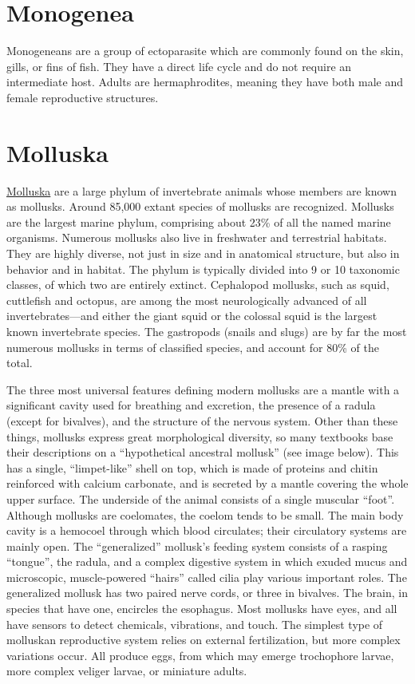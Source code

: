 \section{Monogenea}\label{monogenea}

Monogeneans are a group of ectoparasite which are commonly found on the
skin, gills, or fins of fish. They have a direct life cycle and do not
require an intermediate host. Adults are hermaphrodites, meaning they
have both male and female reproductive structures.

\section{Molluska}\label{molluska}

\href{https://en.wikipedia.org/wiki/Mollusca}{Molluska} are a large
phylum of invertebrate animals whose members are known as mollusks.
Around 85,000 extant species of mollusks are recognized. Mollusks are
the largest marine phylum, comprising about 23\% of all the named marine
organisms. Numerous mollusks also live in freshwater and terrestrial
habitats. They are highly diverse, not just in size and in anatomical
structure, but also in behavior and in habitat. The phylum is typically
divided into 9 or 10 taxonomic classes, of which two are entirely
extinct. Cephalopod mollusks, such as squid, cuttlefish and octopus, are
among the most neurologically advanced of all invertebrates---and either
the giant squid or the colossal squid is the largest known invertebrate
species. The gastropods (snails and slugs) are by far the most numerous
mollusks in terms of classified species, and account for 80\% of the
total.

The three most universal features defining modern mollusks are a mantle
with a significant cavity used for breathing and excretion, the presence
of a radula (except for bivalves), and the structure of the nervous
system. Other than these things, mollusks express great morphological
diversity, so many textbooks base their descriptions on a ``hypothetical
ancestral mollusk'' (see image below). This has a single,
``limpet-like'' shell on top, which is made of proteins and chitin
reinforced with calcium carbonate, and is secreted by a mantle covering
the whole upper surface. The underside of the animal consists of a
single muscular ``foot''. Although mollusks are coelomates, the coelom
tends to be small. The main body cavity is a hemocoel through which
blood circulates; their circulatory systems are mainly open. The
``generalized'' mollusk's feeding system consists of a rasping
``tongue'', the radula, and a complex digestive system in which exuded
mucus and microscopic, muscle-powered ``hairs'' called cilia play
various important roles. The generalized mollusk has two paired nerve
cords, or three in bivalves. The brain, in species that have one,
encircles the esophagus. Most mollusks have eyes, and all have sensors
to detect chemicals, vibrations, and touch. The simplest type of
molluskan reproductive system relies on external fertilization, but more
complex variations occur. All produce eggs, from which may emerge
trochophore larvae, more complex veliger larvae, or miniature adults.


